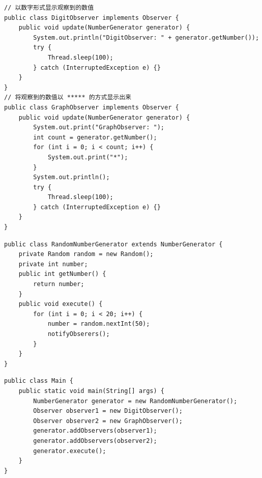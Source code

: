 \begin{lstlisting}
// 以数字形式显示观察到的数值
public class DigitObserver implements Observer {
	public void update(NumberGenerator generator) {
		System.out.println("DigitObserver: " + generator.getNumber());
		try {
			Thread.sleep(100);
		} catch (InterruptedException e) {}
	}
}
// 将观察到的数值以 ***** 的方式显示出来
public class GraphObserver implements Observer {	
	public void update(NumberGenerator generator) {
		System.out.print("GraphObserver: ");
		int count = generator.getNumber();
		for (int i = 0; i < count; i++) {
			System.out.print("*");
		}
		System.out.println();
		try {
			Thread.sleep(100);
		} catch (InterruptedException e) {}
	}
}
\end{lstlisting}
\begin{lstlisting}
public class RandomNumberGenerator extends NumberGenerator {
	private Random random = new Random();
	private int number;
	public int getNumber() {
		return number;
	}
	public void execute() {
		for (int i = 0; i < 20; i++) {
			number = random.nextInt(50);
			notifyObserers();
		}
	}
}
\end{lstlisting}
\begin{lstlisting}
public class Main {
	public static void main(String[] args) {
		NumberGenerator generator = new RandomNumberGenerator();
		Observer observer1 = new DigitObserver();
		Observer observer2 = new GraphObserver();
		generator.addObservers(observer1);
		generator.addObservers(observer2);
		generator.execute();
	}
}
\end{lstlisting}
